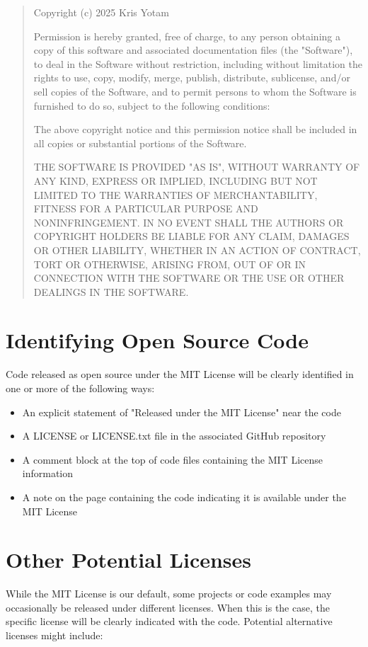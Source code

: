 \documentclass[11pt]{article}
\begin{document}
\begin{quote}
Copyright (c) 2025 Kris Yotam

Permission is hereby granted, free of charge, to any person obtaining a copy of this software and associated documentation files (the "Software"), to deal in the Software without restriction, including without limitation the rights to use, copy, modify, merge, publish, distribute, sublicense, and/or sell copies of the Software, and to permit persons to whom the Software is furnished to do so, subject to the following conditions:

The above copyright notice and this permission notice shall be included in all copies or substantial portions of the Software.

THE SOFTWARE IS PROVIDED "AS IS", WITHOUT WARRANTY OF ANY KIND, EXPRESS OR IMPLIED, INCLUDING BUT NOT LIMITED TO THE WARRANTIES OF MERCHANTABILITY, FITNESS FOR A PARTICULAR PURPOSE AND NONINFRINGEMENT. IN NO EVENT SHALL THE AUTHORS OR COPYRIGHT HOLDERS BE LIABLE FOR ANY CLAIM, DAMAGES OR OTHER LIABILITY, WHETHER IN AN ACTION OF CONTRACT, TORT OR OTHERWISE, ARISING FROM, OUT OF OR IN CONNECTION WITH THE SOFTWARE OR THE USE OR OTHER DEALINGS IN THE SOFTWARE.
\end{quote}

\section{Identifying Open Source Code}
Code released as open source under the MIT License will be clearly identified in one or more of the following ways:
\begin{itemize}
  \item An explicit statement of "Released under the MIT License" near the code
  \item A LICENSE or LICENSE.txt file in the associated GitHub repository
  \item A comment block at the top of code files containing the MIT License information
  \item A note on the page containing the code indicating it is available under the MIT License
\end{itemize}

\section{Other Potential Licenses}
While the MIT License is our default, some projects or code examples may occasionally be released under different licenses. When this is the case, the specific license will be clearly indicated with the code. Potential alternative licenses might include:
\end{document}
